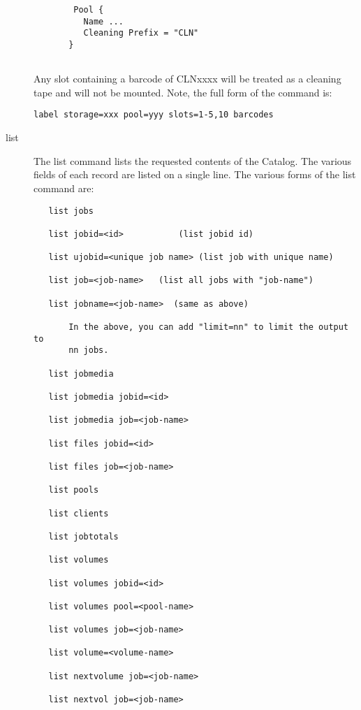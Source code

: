 \begin{description}
\footnotesize
\begin{verbatim}
        Pool {
          Name ...
          Cleaning Prefix = "CLN"
       }
        
\end{verbatim}
\normalsize

Any slot containing a barcode of CLNxxxx will be treated as a cleaning tape
and will not be mounted.  Note, the full form of the command is:

\footnotesize
\begin{verbatim}
label storage=xxx pool=yyy slots=1-5,10 barcodes
\end{verbatim}
\normalsize

\item [list]
   The list command lists the requested contents of the Catalog.  The
   various fields of each record are listed on a single line.  The various
   forms of the list command are:
\footnotesize
\begin{verbatim}
   list jobs
   
   list jobid=<id>           (list jobid id)

   list ujobid=<unique job name> (list job with unique name)
   
   list job=<job-name>   (list all jobs with "job-name")

   list jobname=<job-name>  (same as above)

       In the above, you can add "limit=nn" to limit the output to
       nn jobs.
   
   list jobmedia
   
   list jobmedia jobid=<id>
   
   list jobmedia job=<job-name>
   
   list files jobid=<id>
   
   list files job=<job-name>
   
   list pools
   
   list clients
   
   list jobtotals
   
   list volumes
   
   list volumes jobid=<id>
   
   list volumes pool=<pool-name>
   
   list volumes job=<job-name>
   
   list volume=<volume-name>  

   list nextvolume job=<job-name>
   
   list nextvol job=<job-name>


\end{verbatim}
\end{description}
